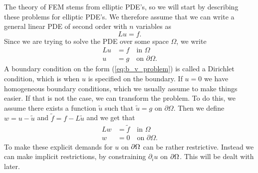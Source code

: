 \iffalse 
\section{Boundary or Initial Value Problems}
When working with ODE's,
whether a problem explicitly states the boundary conditions 
or the initial values does not affect whether a problem can be solved.
When working with 
PDE's that is no longer the case. The different types 
of PDE's demand differently posed problems. 


----THE ABOVE\@: SKAL DET OVERHOVEDET MED?----
\fi

The theory of FEM stems from elliptic PDE's, so we will start by
describing these problems for elliptic PDE's.
We therefore assume that we can write a general linear PDE of second 
order with $n$ variables as 
\begin{equation*}
    Lu = f.
\end{equation*}
Since we are trying to solve the PDE over some space $\Omega$, we write
\begin{align}
    Lu &= f \quad \text{in } \Omega \label{eq:b_v_problem} \\
    u &= g \quad \text{on } \partial \Omega. \nonumber
\end{align}
A boundary condition on the form (\ref{eq:b_v_problem}) is called a 
Dirichlet condition, which is when $u$ is specified on the boundary. 
If $u=0$ we have homogeneous boundary conditions, which we usually assume 
to make things easier. If that is not the case, we can
transform the problem. To do this, we assume there exists a function 
$\tilde{u}$ such that $\tilde{u}=g$ on $\partial \Omega$. Then we define 
$w = u - \tilde{u}$ and $\tilde{f}=f-L\tilde{u}$ and we get that
\begin{align}
    Lw &= \tilde{f} \quad \text{in } \Omega \label{eq:b_v_problem_homogeneous} \\
    w &= 0 \quad \text{on } \partial \Omega. \nonumber
\end{align}
To make these explicit demands for $u$ on $\partial \Omega$ can 
be rather restrictive.
Instead we can make implicit restrictions, by constraining 
$\partial _i u$ on $\partial \Omega$.
This will be dealt with later.